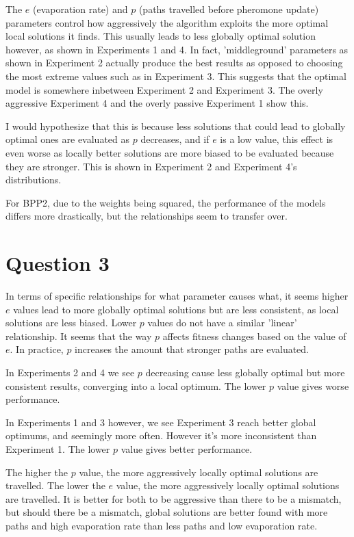 \documentclass[a4paper, 11pt]{article}
\begin{document}
The $e$ (evaporation rate) and $p$ (paths travelled before pheromone update) parameters control how aggressively the algorithm exploits the more optimal local solutions it finds. This usually leads to less globally optimal solution however, as shown in Experiments 1 and 4. In fact, 'middleground' parameters as shown in Experiment 2 actually produce the best results as opposed to choosing the most extreme values such as in Experiment 3. This suggests that the optimal model is somewhere inbetween Experiment 2 and Experiment 3. The overly aggressive Experiment 4 and the overly passive Experiment 1 show this.

I would hypothesize that this is because less solutions that could lead to globally optimal ones are evaluated as $p$ decreases, and if $e$ is a low value, this effect is even worse as locally better solutions are more biased to be evaluated because they are stronger. This is shown in Experiment 2 and Experiment 4's distributions.

For BPP2, due to the weights being squared, the performance of the models differs more drastically, but the relationships seem to transfer over.

\section{Question 3}

In terms of specific relationships for what parameter causes what, it seems higher $e$ values lead to more globally optimal solutions but are less consistent, as local solutions are less biased. Lower $p$ values do not have a similar 'linear' relationship. It seems that the way $p$ affects fitness changes based on the value of $e$. In practice, $p$ increases the amount that stronger paths are evaluated.

In Experiments 2 and 4 we see $p$ decreasing cause less globally optimal but more consistent results, converging into a local optimum. The lower $p$ value gives worse performance.

In Experiments 1 and 3 however, we see Experiment 3 reach better global optimums, and seemingly more often. However it's more inconsistent than Experiment 1. The lower $p$ value gives better performance.

The higher the $p$ value, the more aggressively locally optimal solutions are travelled. The lower the $e$ value, the more aggressively locally optimal solutions are travelled. It is better for both to be aggressive than there to be a mismatch, but should there be a mismatch, global solutions are better found with more paths and high evaporation rate than less paths and low evaporation rate.
\end{document}

